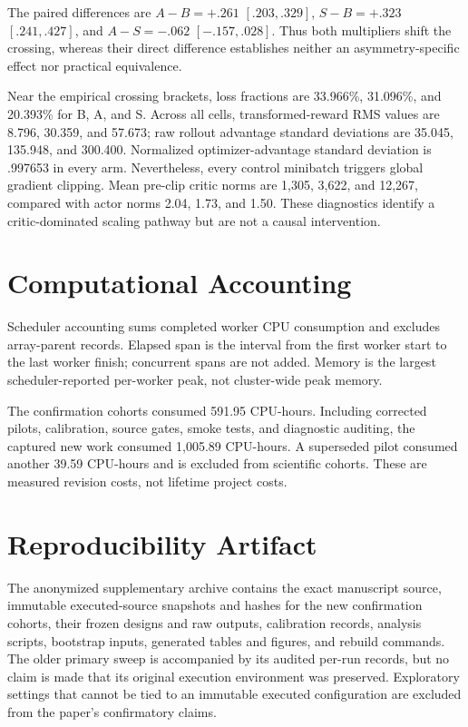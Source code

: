 The paired differences are $A-B=+.261$ $[.203,.329]$, $S-B=+.323$ $[.241,.427]$, and
$A-S=-.062$ $[-.157,.028]$. Thus both multipliers shift the crossing, whereas their direct difference
establishes neither an asymmetry-specific effect nor practical equivalence.

Near the empirical crossing brackets, loss fractions are 33.966\%, 31.096\%, and 20.393\% for B, A,
and S. Across all cells, transformed-reward RMS values are 8.796, 30.359, and 57.673; raw rollout
advantage standard deviations are 35.045, 135.948, and 300.400. Normalized optimizer-advantage
standard deviation is .997653 in every arm. Nevertheless, every control minibatch triggers global
gradient clipping. Mean pre-clip critic norms are 1,305, 3,622, and 12,267, compared with actor norms
2.04, 1.73, and 1.50. These diagnostics identify a critic-dominated scaling pathway but are not a
causal intervention.
\FloatBarrier

\section{Computational Accounting}
\label{app:compute}

Scheduler accounting sums completed worker CPU consumption and excludes array-parent records.
Elapsed span is the interval from the first worker start to the last worker finish; concurrent spans
are not added. Memory is the largest scheduler-reported per-worker peak, not cluster-wide peak memory.



The confirmation cohorts consumed 591.95 CPU-hours. Including corrected pilots, calibration, source
gates, smoke tests, and diagnostic auditing, the captured new work consumed 1,005.89 CPU-hours. A
superseded pilot consumed another 39.59 CPU-hours and is excluded from scientific cohorts. These are
measured revision costs, not lifetime project costs.
\FloatBarrier

\section{Reproducibility Artifact}
\label{app:artifact}

The anonymized supplementary archive contains the exact manuscript source, immutable executed-source
snapshots and hashes for the new confirmation cohorts, their frozen designs and raw outputs, calibration
records, analysis scripts, bootstrap inputs, generated tables and figures, and rebuild commands. The
older primary sweep is accompanied by its audited per-run records, but no claim is made that its original
execution environment was preserved. Exploratory settings that cannot be tied to an immutable executed
configuration are excluded from the paper's confirmatory claims.
